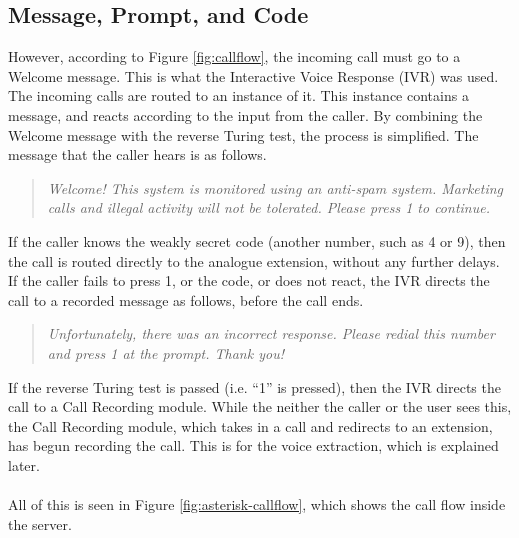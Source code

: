 \documentclass[main.tex]{subfiles}
\begin{document}
\subsection{Message, Prompt, and Code}
However, according to Figure \ref{fig:callflow}, the incoming call must go to a Welcome message. This is what the Interactive Voice Response (IVR) was used. The incoming calls are routed to an instance of it. This instance contains a message, and reacts according to the input from the caller. By combining the Welcome message with the reverse Turing test, the process is simplified. The message that the caller hears is as follows.

\begin{quote}
	\textit{Welcome! This system is monitored using an anti-spam system. Marketing calls and illegal activity will not be tolerated. Please press 1 to continue.}
\end{quote}

If the caller knows the weakly secret code (another number, such as 4 or 9), then the call is routed directly to the analogue extension, without any further delays. If the caller fails to press 1, or the code, or does not react, the IVR directs the call to a recorded message as follows, before the call ends.

\begin{quote}
	\textit{Unfortunately, there was an incorrect response. Please redial this number and press 1 at the prompt. Thank you!}
\end{quote}

If the reverse Turing test is passed (i.e. ``1'' is pressed), then the IVR directs the call to a Call Recording module. While the neither the caller or the user sees this, the Call Recording module, which takes in a call and redirects to an extension, has begun recording the call. This is for the voice extraction, which is explained later.
\\\\
All of this is seen in Figure \ref{fig:asterisk-callflow}, which shows the call flow inside the server.
\end{document}
